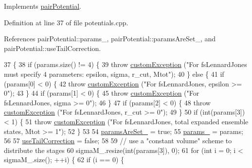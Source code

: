 Implements \hyperlink{classpair_potential_ad4b237646f9de2ae9f95cc9350564bc5}{pair\-Potential}.



Definition at line 37 of file potentials.\-cpp.



References pair\-Potential\-::params\-\_\-, pair\-Potential\-::params\-Are\-Set\-\_\-, and pair\-Potential\-::use\-Tail\-Correction.


\begin{DoxyCode}
37                                                                      \{
38     \textcolor{keywordflow}{if} (params.size() != 4) \{
39         \textcolor{keywordflow}{throw} \hyperlink{classcustom_exception}{customException} (\textcolor{stringliteral}{"For fsLennardJones must specify 4 parameters: epsilon,
       sigma, r\_cut, Mtot"});
40     \} \textcolor{keywordflow}{else} \{
41         \textcolor{keywordflow}{if} (params[0] < 0) \{
42             \textcolor{keywordflow}{throw} \hyperlink{classcustom_exception}{customException} (\textcolor{stringliteral}{"For fsLennardJones, epsilon >= 0"});
43         \}
44         \textcolor{keywordflow}{if} (params[1] < 0) \{
45             \textcolor{keywordflow}{throw} \hyperlink{classcustom_exception}{customException} (\textcolor{stringliteral}{"For fsLennardJones, sigma >= 0"});
46         \}
47         \textcolor{keywordflow}{if} (params[2] < 0) \{
48             \textcolor{keywordflow}{throw} \hyperlink{classcustom_exception}{customException} (\textcolor{stringliteral}{"For fsLennardJones, r\_cut >= 0"});
49         \}
50         \textcolor{keywordflow}{if} (\textcolor{keywordtype}{int}(params[3]) < 1) \{
51             \textcolor{keywordflow}{throw} \hyperlink{classcustom_exception}{customException} (\textcolor{stringliteral}{"For fsLennardJones, total expanded ensemble states, Mtot
       >= 1"});
52         \}
53 
54         \hyperlink{classpair_potential_a635755c0a952bfc05a4cfae230c3dbd2}{paramsAreSet\_} = \textcolor{keyword}{true};
55         \hyperlink{classpair_potential_abf8ec8af983d6e9960bd149da099e883}{params\_} = params;
56 
57         \hyperlink{classpair_potential_ab4b4538a7e13771f50a29aaac2443037}{useTailCorrection} = \textcolor{keyword}{false};
58 
59         \textcolor{comment}{// use a "constant volume" scheme to distribute the stages}
60         sigmaM\_.resize(\textcolor{keywordtype}{int}(params[3]), 0);
61         \textcolor{keywordflow}{for} (\textcolor{keywordtype}{int} i = 0; i < sigmaM\_.size(); ++i) \{
62             \textcolor{keywordflow}{if} (i == 0) \{

\end{DoxyCode}
